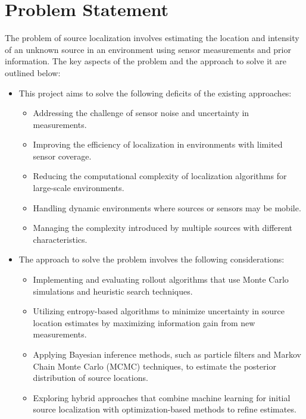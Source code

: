 \documentclass[rnd]{mas_proposal}
\begin{document}
\section{Problem Statement}
The problem of source localization involves estimating the location and intensity of an unknown source in an environment using sensor measurements and prior information. 
The key aspects of the problem and the approach to solve it are outlined below:
\begin{itemize}
    \item This project aims to solve the following deficits of the existing approaches:
    \begin{itemize}
        \item Addressing the challenge of sensor noise and uncertainty in measurements.
        \item Improving the efficiency of localization in environments with limited sensor coverage.
        \item Reducing the computational complexity of localization algorithms for large-scale environments.
        \item Handling dynamic environments where sources or sensors may be mobile.
        \item Managing the complexity introduced by multiple sources with different characteristics.
    \end{itemize}
    \item The approach to solve the problem involves the following considerations:
    \begin{itemize}
        \item Implementing and evaluating rollout algorithms that use Monte Carlo simulations and heuristic search techniques.
        \item Utilizing entropy-based algorithms to minimize uncertainty in source location estimates by maximizing information gain from new measurements.
        \item Applying Bayesian inference methods, such as particle filters and Markov Chain Monte Carlo (MCMC) techniques, to estimate the posterior distribution of source locations.
        \item Exploring hybrid approaches that combine machine learning for initial source localization with optimization-based methods to refine estimates.

\end{itemize}
\end{itemize}
\end{document}

